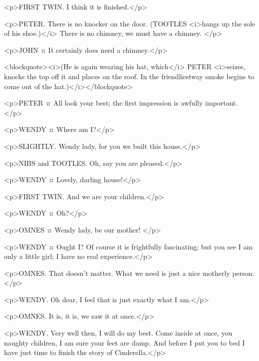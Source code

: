 <p>FIRST TWIN. I think it is finished.</p>

<p>PETER. There is no knocker on the door. (TOOTLES <i>hangs up the sole of his shoe.)</i> There is no chimney, we must have a chimney.
</p>

<p>JOHN ¤
It certainly does need a chimney.</p>

<blockquote><i>(He is again wearing his hat, which</i> PETER <i>seizes, knocks the top off it and places on the roof. In the friendliestway smoke begins to come out of the hat.)</i></blockquote>

<p>PETER ¤
All look your best; the first impression is awfully important.
</p>

<p>WENDY ¤
Where am I?</p>

<p>SLIGHTLY. Wendy lady, for you we built this house.</p>

<p>NIBS and TOOTLES. Oh, say you are pleased.</p>

<p>WENDY ¤
Lovely, darling house!</p>

<p>FIRST TWIN. And we are your children.</p>

<p>WENDY ¤
Oh?</p>

<p>OMNES ¤
Wendy lady, be our mother!
</p>

<p>WENDY ¤
Ought I? Of course it is frightfully fascinating; but you see I am only a little girl; I have no real experience.</p>

<p>OMNES. That doesn't matter. What we need is just a nice motherly person.</p>

<p>WENDY. Oh dear, I feel that is just exactly what I am.</p>

<p>OMNES. It is, it is, we saw it at once.</p>

<p>WENDY. Very well then, I will do my best.
Come inside at once, you naughty children, I am sure your feet are damp. And before I put you to bed I have just time to finish the story of Cinderella.</p>

